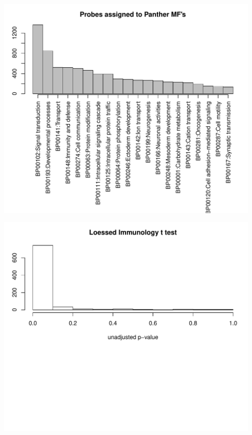 \documentclass{article}\usepackage[]{graphicx}\usepackage[]{color}
\makeatletter
\def\maxwidth{ %
  \ifdim\Gin@nat@width>\linewidth
    \linewidth
  \else
    \Gin@nat@width
  \fi
}
\makeatother
\begin{document}
\begin{Schunk}


{\centering \includegraphics[width=\maxwidth]{figure/Nov_3_gene_list_and_testing-1} 

}



{\centering \includegraphics[width=\maxwidth]{figure/Nov_3_gene_list_and_testing-2} 

}




\end{Schunk}
\end{document}
